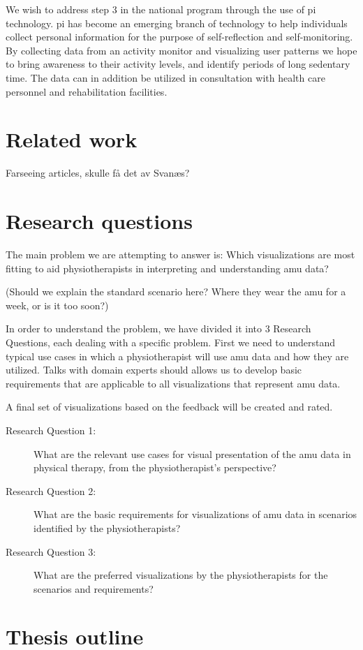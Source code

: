 We wish to address step 3 in the national program through the use of \gls{pi} technology. \gls{pi} has become an emerging branch of technology to help individuals collect personal information for the purpose of self-reflection and self-monitoring. By collecting data from an activity monitor and visualizing user patterns we hope to bring awareness to their activity levels, and identify periods of long sedentary time. The data can in addition be utilized in consultation with health care personnel and rehabilitation facilities.

\section{Related work}
Farseeing articles, skulle få det av Svanæs?

\section{Research questions}
The main problem we are attempting to answer is: Which visualizations are most fitting to aid physiotherapists in interpreting and understanding \gls{amu} data?

(Should we explain the standard scenario here? Where they wear the \gls{amu} for a week, or is it too soon?)

In order to understand the problem, we have divided it into 3 Research Questions, each dealing with a specific problem. First we need to understand typical use cases in which a physiotherapist will use \gls{amu} data and how they are utilized. Talks with domain experts should allows us to develop basic requirements that are applicable to all visualizations that represent \gls{amu} data.

 A final set of visualizations based on the feedback will be created and rated.

\begin{description}
\item[Research Question 1:] What are the relevant use cases for visual presentation of the \gls{amu} data in physical therapy, from the physiotherapist's perspective?

\item[Research Question 2:] What are the basic requirements for visualizations of \gls{amu} data in scenarios identified by the physiotherapists?

\item[Research Question 3:] What are the preferred visualizations by the physiotherapists for the scenarios and requirements?
\end{description}

\section{Thesis outline}
